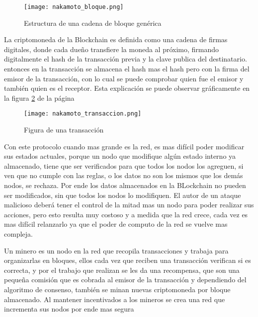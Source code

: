 \begin{figure}[hbt!]
    \centering
    {\texttt{[image: nakamoto\_bloque.png]}}
    \caption{Estructura de una cadena de bloque genérica \cite[]{nakamoto_bitcoin_2008}}
    \label{img:nakamoto_bloque}
\end{figure}


La criptomoneda de la  Blockchain es definida como una cadena de firmas digitales, donde cada dueño transfiere la moneda al próximo,
firmando digitalmente el hash de la transacción previa y la clave publica del destinatario. entonces en la transacción se almacena el hash
mas el hash pero con la firma del emisor de la transacción, con lo cual se puede comprobar quien fue el emisor y también quien es el receptor.
Esta explicación se puede observar gráficamente en la figura \ref{img:nakamoto_transaccion} de la  página \pageref{img:nakamoto_transaccion}
\cite[]{nakamoto_bitcoin_2008}

\begin{figure}[hbt!]
    \centering
    {\texttt{[image: nakamoto\_transaccion.png]}}
    \caption{Figura de una transacción \cite[]{nakamoto_bitcoin_2008}}
    \label{img:nakamoto_transaccion}
\end{figure}

Con este protocolo cuando mas grande es la red, es mas difícil poder modificar sus estados actuales, 
porque un nodo que modifique algún estado interno ya almacenado,
tiene que ser verificados para que todos los nodos los agreguen, si ven que no cumple con las reglas, o los datos
no son los mismos que los demás nodos, se rechaza. 
Por ende los datos almacenados en la BLockchain no pueden ser modificados, sin que todos los nodos lo modifiquen.
El autor de un ataque malicioso deberá tener el control de la mitad mas un nodo para poder realizar sus acciones, pero esto resulta
muy costoso y a medida que la red crece, cada vez es mas difícil relanzarlo ya que el poder de computo de la red se vuelve mas compleja. \cite[]{joaquin_lopez_lerida_economiBlockchain_2016,nakamoto_bitcoin_2008}

Un minero es un nodo en la red que recopila transacciones y trabaja para organizarlas en bloques, 
ellos cada vez que reciben una transacción verifican si es correcta, y por el trabajo que realizan se les da una recompensa,
que son una pequeña comisión que es cobrada al emisor de la transacción y dependiendo del algoritmo de consenso, también se minan nuevas 
criptomoneda por bloque almacenado. Al mantener incentivados a los mineros se crea una red que incrementa sus nodos por ende mas  segura \cite[]{preukschat_Blockchain_2018,joaquin_lopez_lerida_economiBlockchain_2016,nakamoto_bitcoin_2008}  

